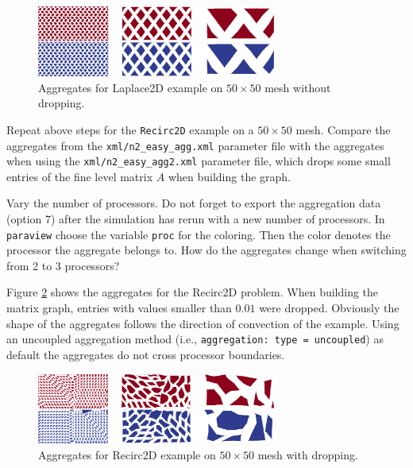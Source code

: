 \documentclass[10pt,fleqn]{book}
\begin{document}
\begin{figure}
\centering
\includegraphics[width=0.7\textwidth]{pics/aggsSymm.png}
\caption{Aggregates for Laplace2D example on $50\times 50$ mesh without dropping.}
\label{fig:symAggs}
\end{figure}

\begin{exercise}
Repeat above steps for the \verb|Recirc2D| example on a $50\times 50$ mesh. Compare the aggregates from the \verb|xml/n2_easy_agg.xml| parameter file with the aggregates when using the \verb|xml/n2_easy_agg2.xml| parameter file, which drops some small entries of the fine level matrix $A$ when building the graph.
\end{exercise}
\begin{exercise}
Vary the number of processors. Do not forget to export the aggregation data (option 7) after the simulation has rerun with a new number of processors. In \verb|paraview| choose the variable \verb|proc| for the coloring. Then the color denotes the processor the aggregate belongs to. How do the aggregates change when switching from 2 to 3 processors?
\end{exercise}

Figure \ref{fig:nonsymAggs} shows the aggregates for the Recirc2D problem. When building the matrix graph, entries with values smaller than $0.01$ were dropped. Obviously the shape of the aggregates follows the direction of convection of the example. Using an uncoupled aggregation method (i.e., \texttt{aggregation: type = uncoupled}) as default the aggregates do not cross processor boundaries.
\begin{figure}
\centering
\includegraphics[width=0.7\textwidth]{pics/aggsNonSymm.png}
\caption{Aggregates for Recirc2D example on $50\times 50$ mesh with dropping.}
\label{fig:nonsymAggs}
\end{figure}
\end{document}
